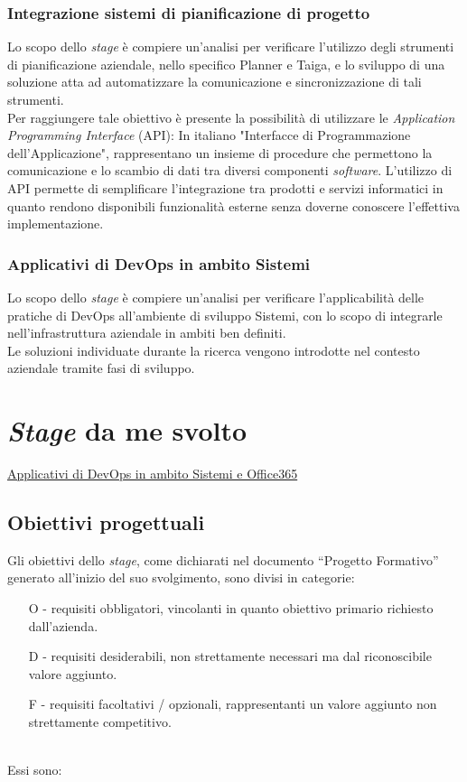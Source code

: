 \subsubsection*{Integrazione sistemi di pianificazione di progetto}
Lo scopo dello \emph{stage} è compiere un'analisi per verificare l'utilizzo degli strumenti di pianificazione aziendale, nello specifico Planner e Taiga, e lo sviluppo di una soluzione atta ad automatizzare la comunicazione e sincronizzazione di tali strumenti.\\
Per raggiungere tale obiettivo è presente la possibilità di utilizzare le \emph{Application Programming Interface} (API): In italiano "Interfacce di Programmazione dell'Applicazione", rappresentano un insieme di procedure che permettono la comunicazione e lo scambio di dati tra diversi componenti \emph{software}. L'utilizzo di API permette di semplificare l'integrazione tra prodotti e servizi informatici in quanto rendono disponibili funzionalità esterne senza doverne conoscere l'effettiva implementazione.

\subsubsection*{Applicativi di DevOps in ambito Sistemi}
\label{stageDavide}
Lo scopo dello \emph{stage} è compiere un'analisi per verificare l'applicabilità delle pratiche di \gls{DevOps} all'ambiente di sviluppo \gls{Sistemi}, con lo scopo di integrarle nell'infrastruttura aziendale in ambiti ben definiti.\\
Le soluzioni individuate durante la ricerca vengono introdotte nel contesto aziendale tramite fasi di sviluppo. 
 

\section{\emph{Stage} da me svolto}
\hyperref[mioStage]{Applicativi di DevOps in ambito Sistemi e Office365}
\subsection{Obiettivi progettuali}
Gli obiettivi dello \emph{stage}, come dichiarati nel documento “Progetto Formativo” generato all'inizio del suo svolgimento, sono divisi in categorie:
\begin{enumerate}
	\item[O -]requisiti obbligatori, vincolanti in quanto obiettivo primario richiesto dall'azienda.
    \item[D -]requisiti desiderabili, non strettamente necessari ma dal riconoscibile valore aggiunto.
    \item[F -]requisiti facoltativi / opzionali, rappresentanti un valore aggiunto non strettamente competitivo.\\\\
\end{enumerate}
Essi sono:

